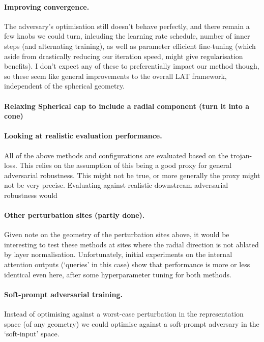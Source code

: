 \documentclass[11pt]{article}
\begin{document}
\paragraph{Improving convergence.}
The adversary's optimisation still doesn't behave perfectly, and there remain a few knobs we could turn, inlcuding the learning rate schedule, number of inner steps (and alternating training), as well as parameter efficient fine-tuning (which aside from drastically reducing our iteration speed, might give regularisation benefits).
I don't expect any of these to preferentially impact our method though, so these seem like general improvements to the overall LAT framework, independent of the spherical geometry. 

\paragraph{Relaxing Spherical cap to include a radial component (turn it into a cone)}


\paragraph{Looking at realistic evaluation performance.}
All of the above methods and configurations are evaluated based on the trojan-loss. This relies on the assumption of this being a good proxy for general adversarial robustness. This might not be true, or more generally the proxy might not be very precise. 
Evaluating against realistic downstream adversarial robustness would 


\paragraph{Other perturbation sites (partly done).}
Given note on the geometry of the perturbation sites above, it would be interesting to test these methods at sites where the radial direction is not ablated by layer normalisation. 
Unfortunately, initial experiments on the internal attention outputs (`queries' in this case) show that performance is more or less identical even here, after some hyperparameter tuning for both methods.


\paragraph{Soft-prompt adversarial training.}
Instead of optimising against a worst-case perturbation in the representation space (of any geometry) we could optimise against a soft-prompt adversary in the `soft-input' space. 
\end{document}
